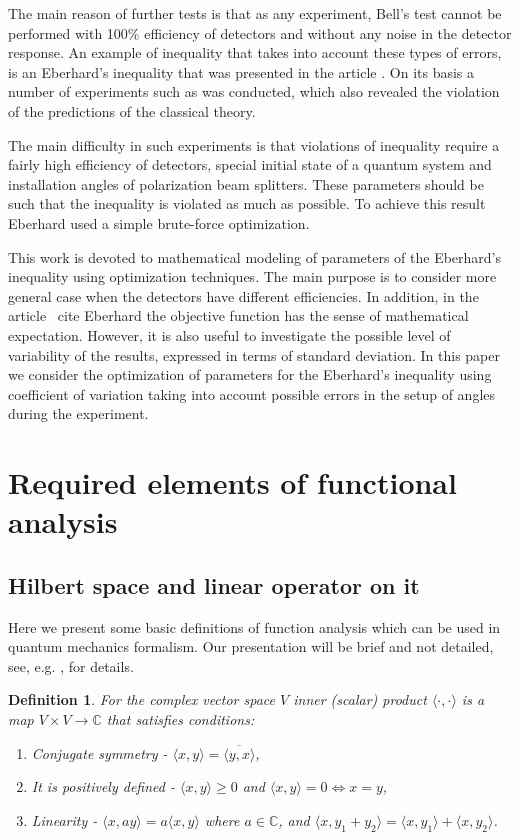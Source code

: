 \documentclass[11pt]{article}
\newtheorem{definition}{Definition}[section]
\begin{document}
The main reason of further tests is that as any experiment, Bell's test cannot be performed with 100\% efficiency of detectors and without any noise in the detector response. An example of inequality that takes into account these types of errors, is an Eberhard's inequality that was presented in the article \cite{Eberhard}. On its basis a number of experiments such as \cite{Zeilinger} was conducted, which also revealed the violation of the predictions of the classical theory.

The main difficulty in such experiments is that violations of inequality require a fairly high efficiency of detectors, special initial state of a quantum system and installation angles of polarization beam splitters. These parameters should be such that the inequality is violated as much as possible. To achieve this result Eberhard used a simple brute-force optimization.

This work is devoted to mathematical modeling of parameters of the Eberhard's inequality using optimization techniques. The main purpose is to consider more general case when the detectors have different efficiencies. In addition, in the article \ cite {Eberhard} the objective function has the sense of mathematical expectation. However, it is also useful to investigate the possible level of variability of the results, expressed in terms of standard deviation. In this paper we consider the optimization of parameters for the Eberhard's inequality using coefficient of variation taking into account possible errors in the setup of angles during the experiment.


\section{Required elements of functional analysis}
\subsection{Hilbert space and linear operator on it}
Here we present some basic definitions of function analysis which can be used in quantum mechanics formalism. Our presentation will be brief and not detailed, see, e.g. \cite{advanced_la}, for details.

\begin{definition}
For the complex vector space $V$ inner (scalar) product $\langle\cdot,\cdot\rangle$ is a map $V\times V \to \mathbb{C}$ that satisfies conditions:
\begin{enumerate}
\item Conjugate symmetry - $\langle x, y\rangle = \overline{\langle y, x\rangle}$,
\item It is positively defined - $\langle x, y\rangle \geq 0$ and $\langle x, y\rangle = 0 \Leftrightarrow x = y$,
\item Linearity - $\langle x, ay\rangle = a\langle x, y\rangle$ where $a\in\mathbb{C}$, and $\langle x, y_1 + y_2\rangle = \langle x, y_1\rangle + \langle x, y_2\rangle$.
\end{enumerate}
\end{definition}
\end{document}
